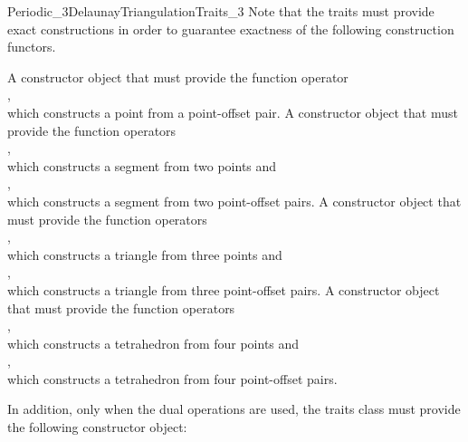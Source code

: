 \begin{ccRefConcept}{Periodic_3DelaunayTriangulationTraits_3}
Note that the traits must provide exact constructions in order to
guarantee exactness of the following construction functors.

{A constructor object that must provide the function operator\\
,\\
which constructs a point from a point-offset pair.
}
\ccGlue
{}
{A constructor object that must provide the function operators\\
,\\
which constructs a segment from two points and\\
,\\
which constructs a segment from two point-offset pairs.
}
\ccGlue
{}
{A constructor object that must provide the function operators\\
,\\
which constructs a triangle from three points and\\
,\\
which constructs a triangle from three point-offset pairs.
}
\ccGlue
{}
{A constructor object that must provide the function operators\\
,\\
which constructs a tetrahedron from four points and\\
,\\
which constructs a tetrahedron from four point-offset pairs.
}

In addition, only when the dual operations are used, the traits class
must provide the following constructor object: 


\end{ccRefConcept}
